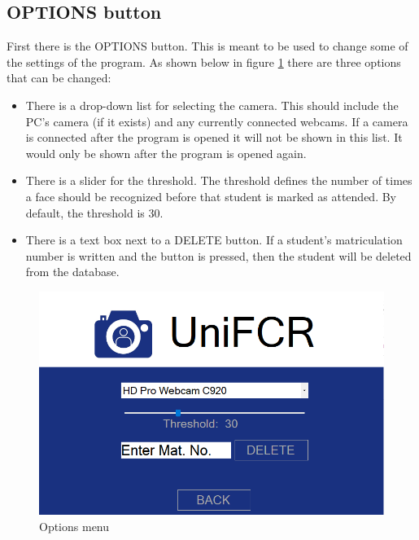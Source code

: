 \documentclass[12pt, a4paper]{article}
\begin{document}
\subsection{OPTIONS button}
First there is the OPTIONS button. This is meant to be used to change some of the settings of the program. As shown below in figure \ref{fig:options} there are three options that can be changed:
\begin{itemize}
\item There is a drop-down list for selecting the camera. This should include the PC’s camera (if it exists) and any currently connected webcams. If a camera is connected after the program is opened it will not be shown in this list. It would only be shown after the program is opened again. 
\item There is a slider for the threshold. The threshold defines the number of times a face should be recognized before that student is marked as attended. By default, the threshold is 30.
\item There is a text box next to a DELETE button. If a student’s matriculation number is written and the button is pressed, then the student will be deleted from the database.
\end{itemize}

\begin{figure}[h!]
\begin{center}
	\centering
		\includegraphics[width=1.0\columnwidth]{images/options}
	\caption{Options menu}
	\label{fig:options}
\end{center}
\end{figure}
\end{document}
